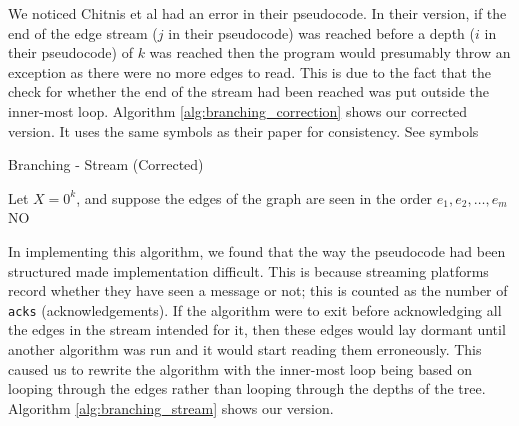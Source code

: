We noticed Chitnis et al had an error in their pseudocode. In their
version, if the end of the edge stream (\(j\) in their pseudocode) was reached
before a depth (\(i\) in their pseudocode) of \(k\) was reached then the
program would presumably throw an exception as there were no more edges to
read. This is due to the fact that the check for whether the end of the stream
had been reached was put outside the inner-most loop. Algorithm
\ref{alg:branching_correction} shows our corrected version. It uses the same
symbols as their paper for consistency. See symbols

\begin{algorithm}[htb]
    \caption{Branching - Stream (Corrected)}
    \label{alg:branching_correction}
    \DontPrintSemicolon


    Let $X = 0^k$, and suppose the edges of the graph are seen in the order $e_1, e_2, \dots, e_m$\;
    \Return NO
\end{algorithm}

In implementing this algorithm, we found that the way the pseudocode had been
structured made implementation difficult. This is because streaming platforms
record whether they have seen a message or not; this is counted as the number
of \texttt{acks} (acknowledgements). If the algorithm were to exit before
acknowledging all the edges in the stream intended for it, then these edges
would lay dormant until another algorithm was run and it would start reading
them erroneously. This caused us to rewrite the algorithm with the inner-most
loop being based on looping through the edges rather than looping through the
depths of the tree. Algorithm \ref{alg:branching_stream} shows our version.

